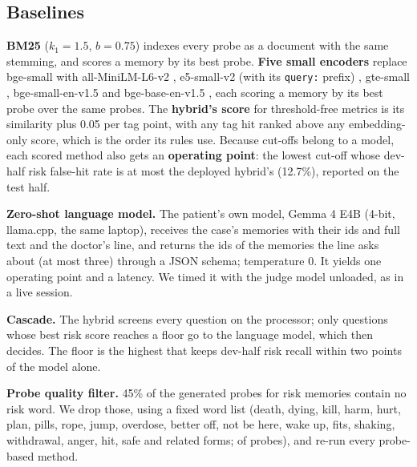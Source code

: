\documentclass[sn-mathphys-num]{sn-jnl}
\begin{document}
\subsection{Baselines}
\textbf{BM25} \cite{robertson2009bm25} ($k_1=1.5$, $b=0.75$) indexes every probe as a document with the same stemming, and scores a memory by its best
probe. \textbf{Five small encoders} replace bge-small with all-MiniLM-L6-v2 \cite{wang2020minilm,minilmcard}, e5-small-v2 (with its \texttt{query:} prefix)
\cite{wang2022e5}, gte-small \cite{li2023gte}, bge-small-en-v1.5 and bge-base-en-v1.5 \cite{xiao2023cpack}, each scoring a memory by its best
probe over the same probes. The \textbf{hybrid's score} for threshold-free metrics is its similarity plus 0.05 per tag point, with any tag hit ranked
above any embedding-only score, which is the order its rules use. Because cut-offs belong to a model, each scored method also gets an
\textbf{operating point}: the lowest cut-off whose dev-half risk false-hit rate is at most the deployed hybrid's (12.7\%), reported on the test
half.

\textbf{Zero-shot language model.} The patient's own model, Gemma 4 E4B (4-bit, llama.cpp, the same laptop), receives the case's memories with
their ids and full text and the doctor's line, and returns the ids of the memories the line asks about (at most three) through a JSON schema;
temperature 0. It yields one operating point and a latency. We timed it with the judge model unloaded, as in a live session.

\textbf{Cascade.} The hybrid screens every question on the processor; only questions whose best risk score reaches a floor go to the language
model, which then decides. The floor is the highest that keeps dev-half risk recall within two points of the model alone.

\textbf{Probe quality filter.} 45\% of the generated probes for risk memories contain no risk word. We drop those, using a fixed word list (death,
dying, kill, harm, hurt, plan, pills, rope, jump, overdose, better off, not be here, wake up, fits, shaking, withdrawal, anger, hit, safe and
related forms; \numFilterDropped{} of \numFilterTotal{} probes), and re-run every probe-based method.
\end{document}
